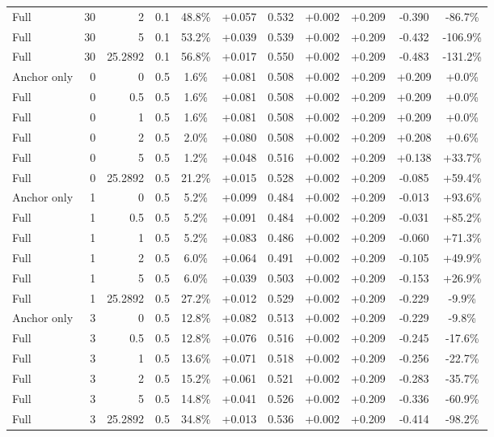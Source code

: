 \begin{table}[htbp]
\begin{tabular}{lrrrccccccc}
Full & 30 & 2 & 0.1 & 48.8\% & +0.057 & 0.532 & +0.002 & +0.209 & -0.390 & -86.7\% \\
Full & 30 & 5 & 0.1 & 53.2\% & +0.039 & 0.539 & +0.002 & +0.209 & -0.432 & -106.9\% \\
Full & 30 & 25.2892 & 0.1 & 56.8\% & +0.017 & 0.550 & +0.002 & +0.209 & -0.483 & -131.2\% \\
Anchor only & 0 & 0 & 0.5 & 1.6\% & +0.081 & 0.508 & +0.002 & +0.209 & +0.209 & +0.0\% \\
Full & 0 & 0.5 & 0.5 & 1.6\% & +0.081 & 0.508 & +0.002 & +0.209 & +0.209 & +0.0\% \\
Full & 0 & 1 & 0.5 & 1.6\% & +0.081 & 0.508 & +0.002 & +0.209 & +0.209 & +0.0\% \\
Full & 0 & 2 & 0.5 & 2.0\% & +0.080 & 0.508 & +0.002 & +0.209 & +0.208 & +0.6\% \\
Full & 0 & 5 & 0.5 & 1.2\% & +0.048 & 0.516 & +0.002 & +0.209 & +0.138 & +33.7\% \\
Full & 0 & 25.2892 & 0.5 & 21.2\% & +0.015 & 0.528 & +0.002 & +0.209 & -0.085 & +59.4\% \\
Anchor only & 1 & 0 & 0.5 & 5.2\% & +0.099 & 0.484 & +0.002 & +0.209 & -0.013 & +93.6\% \\
Full & 1 & 0.5 & 0.5 & 5.2\% & +0.091 & 0.484 & +0.002 & +0.209 & -0.031 & +85.2\% \\
Full & 1 & 1 & 0.5 & 5.2\% & +0.083 & 0.486 & +0.002 & +0.209 & -0.060 & +71.3\% \\
Full & 1 & 2 & 0.5 & 6.0\% & +0.064 & 0.491 & +0.002 & +0.209 & -0.105 & +49.9\% \\
Full & 1 & 5 & 0.5 & 6.0\% & +0.039 & 0.503 & +0.002 & +0.209 & -0.153 & +26.9\% \\
Full & 1 & 25.2892 & 0.5 & 27.2\% & +0.012 & 0.529 & +0.002 & +0.209 & -0.229 & -9.9\% \\
Anchor only & 3 & 0 & 0.5 & 12.8\% & +0.082 & 0.513 & +0.002 & +0.209 & -0.229 & -9.8\% \\
Full & 3 & 0.5 & 0.5 & 12.8\% & +0.076 & 0.516 & +0.002 & +0.209 & -0.245 & -17.6\% \\
Full & 3 & 1 & 0.5 & 13.6\% & +0.071 & 0.518 & +0.002 & +0.209 & -0.256 & -22.7\% \\
Full & 3 & 2 & 0.5 & 15.2\% & +0.061 & 0.521 & +0.002 & +0.209 & -0.283 & -35.7\% \\
Full & 3 & 5 & 0.5 & 14.8\% & +0.041 & 0.526 & +0.002 & +0.209 & -0.336 & -60.9\% \\
Full & 3 & 25.2892 & 0.5 & 34.8\% & +0.013 & 0.536 & +0.002 & +0.209 & -0.414 & -98.2\% \\

\end{tabular}
\end{table}
